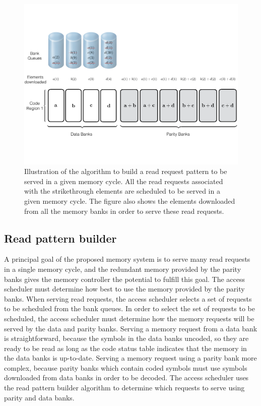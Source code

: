 \begin{figure}[htbp]
	\centering
	\includegraphics[width=0.96\linewidth]{fig/Read-Algo-Example.pdf}
	\caption{{Illustration of the algorithm to build a read request pattern to be served in a given memory cycle. All the read requests associated with the strikethrough elements are scheduled to be served in a given memory cycle. The figure also shows the elements downloaded from all the memory banks in order to serve these read requests.}}
	\label{fig:readAlgoAccessPattern}
\end{figure}
\subsection{Read pattern builder}
\label{sec:readCodingAlgo}
A principal goal of the proposed memory system is to serve many read requests in a single memory cycle, and the redundant memory provided by the parity banks gives the memory controller the potential to fulfill this goal. The access scheduler must determine how best to use the memory provided by the parity banks. When serving read requests, the access scheduler selects a set of requests to be scheduled from the bank queues. In order to select the set of requests to be scheduled, the access scheduler must determine how the memory requests will be served by the data and parity banks. Serving a memory request from a data bank is straightforward, because the symbols in the data banks uncoded, so they are ready to be read as long as the code status table indicates that the memory in the data banks is up-to-date. Serving a memory request using a parity bank more complex, because parity banks which contain coded symbols must use symbols downloaded from data banks in order to be decoded. The access scheduler uses the read pattern builder algorithm to determine which requests to serve using parity and data banks. 

